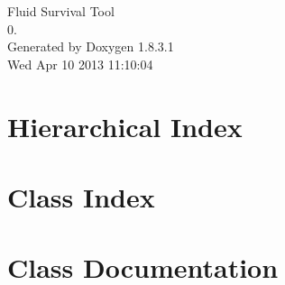 \documentclass{book}
\begin{document}
\hypersetup{pageanchor=false,citecolor=blue}
\begin{titlepage}
\vspace*{7cm}
\begin{center}
{\Large Fluid Survival Tool \\[1ex]\large 0. }\\
\vspace*{1cm}
{\large Generated by Doxygen 1.8.3.1}\\
\vspace*{0.5cm}
{\small Wed Apr 10 2013 11:10:04}\\
\end{center}
\end{titlepage}
\clearemptydoublepage
{}
\tableofcontents
\clearemptydoublepage
{}
\hypersetup{pageanchor=true,citecolor=blue}
\chapter{Hierarchical Index}

\chapter{Class Index}

\chapter{Class Documentation}














































\printindex
\end{document}
